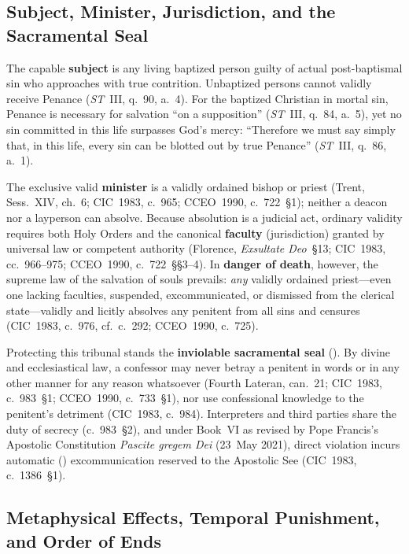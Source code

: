 \subsection{Subject, Minister, Jurisdiction, and the Sacramental Seal}
\label{subsec:penance-minister-subject}

The capable \textbf{subject} is any living baptized person guilty of actual post-baptismal sin who approaches with true contrition. Unbaptized persons cannot validly receive Penance (\emph{ST}~III, q.~90, a.~4). For the baptized Christian in mortal sin, Penance is necessary for salvation ``on a supposition'' (\emph{ST}~III, q.~84, a.~5), yet no sin committed in this life surpasses God's mercy: ``Therefore we must say simply that, in this life, every sin can be blotted out by true Penance'' (\emph{ST}~III, q.~86, a.~1).

The exclusive valid \textbf{minister} is a validly ordained bishop or priest (Trent, Sess.~XIV, ch.~6; CIC~1983, c.~965; CCEO~1990, c.~722~\S1); neither a deacon nor a layperson can absolve. Because absolution is a judicial act, ordinary validity requires both Holy Orders and the canonical \textbf{faculty} (jurisdiction) granted by universal law or competent authority (Florence, \emph{Exsultate Deo}~\S13; CIC~1983, cc.~966--975; CCEO~1990, c.~722~\S\S3--4). In \textbf{danger of death}, however, the supreme law of the salvation of souls prevails: \emph{any} validly ordained priest---even one lacking faculties, suspended, excommunicated, or dismissed from the clerical state---validly and licitly absolves any penitent from all sins and censures (CIC~1983, c.~976, cf.~c.~292; CCEO~1990, c.~725).

Protecting this tribunal stands the \textbf{inviolable sacramental seal} (). By divine and ecclesiastical law, a confessor may never betray a penitent in words or in any other manner for any reason whatsoever (Fourth Lateran, can.~21; CIC~1983, c.~983~\S1; CCEO~1990, c.~733~\S1), nor use confessional knowledge to the penitent's detriment (CIC~1983, c.~984). Interpreters and third parties share the duty of secrecy (c.~983~\S2), and under Book~VI as revised by Pope Francis's Apostolic Constitution \emph{Pascite gregem Dei} (23~May 2021), direct violation incurs automatic () excommunication reserved to the Apostolic See (CIC~1983, c.~1386~\S1).

\subsection{Metaphysical Effects, Temporal Punishment, and Order of Ends}
\label{subsec:penance-effects-ends}

